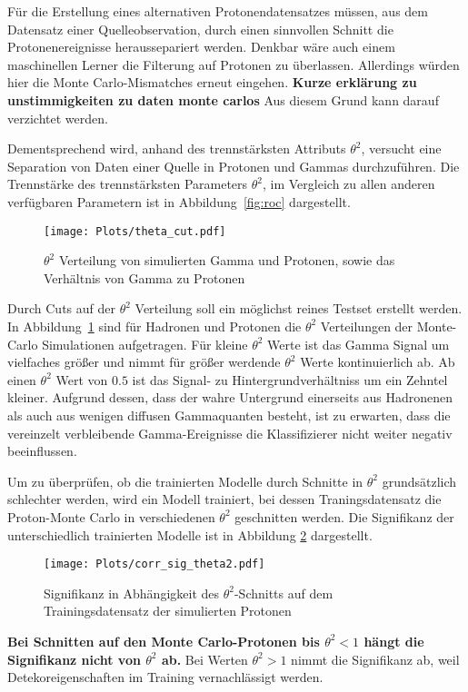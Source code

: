Für die Erstellung eines alternativen Protonendatensatzes müssen, aus dem Datensatz einer Quelleobservation, durch einen sinnvollen Schnitt die Protonenereignisse heraussepariert werden. 
Denkbar wäre auch einem maschinellen Lerner die Filterung auf Protonen zu überlassen.
Allerdings würden hier die Monte Carlo-Mismatches erneut eingehen. \textbf{Kurze erklärung zu unstimmigkeiten zu daten monte carlos} Aus diesem Grund kann darauf verzichtet werden.

Dementsprechend wird, anhand des trennstärksten Attributs $\theta^{2}$, versucht eine Separation von Daten einer Quelle in Protonen und Gammas durchzuführen. 
Die Trennstärke des trennstärksten Parameters $\theta^{2}$, im Vergleich zu allen anderen verfügbaren Parametern ist in Abbildung~\ref{fig:roc} dargestellt. 
\begin{figure}[H]
  \centering
  \texttt{[image: Plots/theta\_cut.pdf]}
  \caption{$\theta^{2}$ Verteilung von simulierten Gamma und Protonen, sowie das Verhältnis von Gamma zu Protonen}
  \label{fig:thetacut}
\end{figure}
Durch Cuts auf der $\theta^{2}$ Verteilung soll ein möglichst reines Testset erstellt werden. 
In Abbildung~\ref{fig:thetacut} sind für Hadronen und Protonen die $\theta^{2}$ Verteilungen der Monte-Carlo Simulationen aufgetragen. 
Für kleine $\theta^{2}$ Werte ist das Gamma Signal um vielfaches größer und nimmt für größer werdende $\theta^{2}$ Werte kontinuierlich ab. 
Ab einen $\theta^{2}$ Wert von $0.5$ ist das Signal- zu Hintergrundverhältniss um ein Zehntel kleiner.
Aufgrund dessen, dass der wahre Untergrund einerseits aus Hadronenen als auch aus wenigen diffusen Gammaquanten besteht, ist zu erwarten, dass die vereinzelt verbleibende Gamma-Ereignisse die Klassifizierer nicht weiter negativ beeinflussen.

Um zu überprüfen, ob die trainierten Modelle durch Schnitte in $\theta^{2}$ grundsätzlich schlechter werden, wird ein Modell trainiert, bei dessen Traningsdatensatz die Proton-Monte Carlo in verschiedenen $\theta^{2}$ geschnitten werden. 
Die Signifikanz der unterschiedlich trainierten Modelle ist in Abbildung \ref{fig:corrtheta} dargestellt.
\begin{figure}[H]
  \centering
  \texttt{[image: Plots/corr\_sig\_theta2.pdf]}
  \caption{Signifikanz in Abhängigkeit des $\theta^{2}$-Schnitts auf dem Trainingsdatensatz der simulierten Protonen}
  \label{fig:corrtheta}
\end{figure}
\textbf{Bei Schnitten auf den Monte Carlo-Protonen bis $\theta^{2} < 1$ hängt die Signifikanz nicht von $\theta^{2}$ ab.}
Bei Werten $\theta^{2} > 1$ nimmt die Signifikanz ab, weil Detekoreigenschaften im Training vernachlässigt werden.


